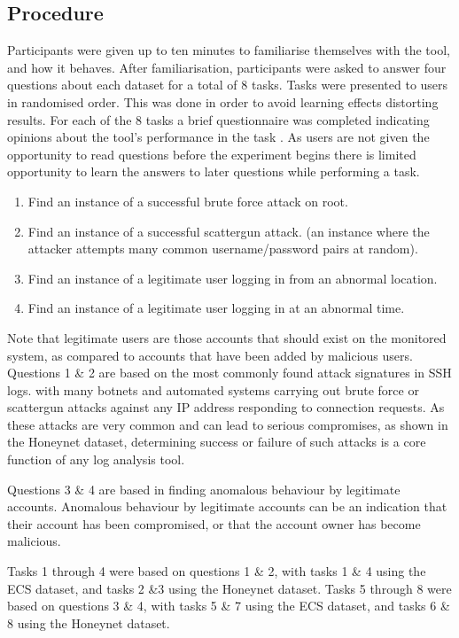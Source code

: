 \subsection{Procedure}
Participants were given up to ten minutes to familiarise themselves with the tool, and how it behaves. After familiarisation, participants were asked to answer four questions about each  dataset for a total of 8 tasks. Tasks were presented to users in randomised order. This was done in order to avoid learning effects distorting results. For each of the 8 tasks a brief questionnaire was completed indicating opinions about the tool's performance in the task \cite{lewis1995ibm}. As users are not given the opportunity to read questions before the experiment begins there is limited opportunity to learn the answers to later questions while performing a task. 

\begin{enumerate}
\item{Find an instance of a successful brute force attack on root.}
\item{Find an instance of a successful scattergun attack.
(an instance where the attacker attempts many common username/password pairs at random).}
\item{Find an instance of a legitimate user logging in from an abnormal location.}
\item{Find an instance of a legitimate user logging in at an abnormal time.}
\end{enumerate}

Note that legitimate users are those accounts that should exist on the monitored system, as compared to accounts that have been added by malicious users.
Questions 1 \& 2 are based on the most commonly found attack signatures in SSH logs. with many botnets and automated systems carrying out brute force or scattergun attacks against any IP address responding to connection requests. As these attacks are very common and can lead to serious compromises, as shown in the Honeynet dataset, determining success or failure of such attacks is a core function of any log analysis tool. 

Questions 3 \& 4 are based in finding anomalous behaviour by legitimate accounts. Anomalous behaviour by legitimate accounts can be an indication that their account has been compromised, or that the account owner has become malicious.  

Tasks 1 through 4 were based on questions 1 \& 2, with tasks 1 \& 4 using the ECS dataset, and tasks 2 \&3 using the Honeynet dataset.
Tasks 5 through 8 were based on questions 3 \& 4, with tasks 5 \& 7 using the ECS dataset, and tasks 6 \& 8 using  the Honeynet dataset. 

